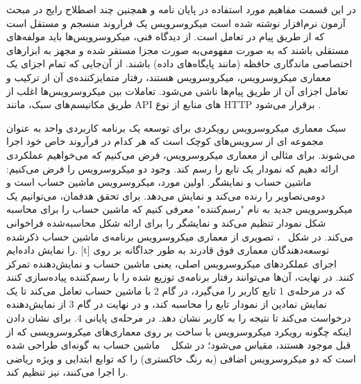 

در این قسمت مفاهیم مورد استفاده در پایان نامه و همچنین چند اصطلاح رایج در مبحث آزمون نرم‌افزار نوشته شده است
میکروسرویس یک فراروند منسجم و مستقل است که از طریق پیام‌ در تعامل است. از دیدگاه فنی، میکروسرویس‌ها باید مولفه‌های مستقلی باشند که به صورت مفهومی‌به صورت مجزا مستقر شده و مجهز به ابزارهای اختصاصی ماندگاری حافظه (مانند پایگاه‌های داده) باشند. از آن‌جایی که تمام اجزای یک معماری میکروسرویس، میکروسرویس هستند، رفتار متمایزکننده‌ی آن از ترکیب و تعامل اجزای آن از طریق پیام‌ها ناشی می‌شود. تعاملات بین میکروسرویس‌ها اغلب از طریق مکانیسم‌های سبک، مانند API های منابع از نوع HTTP برقرار می‌شود . 


سبک معماری میکروسرویس رویکردی برای توسعه یک برنامه کاربردی واحد به عنوان مجموعه ای از سرویس‌های کوچک است که هر کدام در فرآروند خاص خود اجرا می‌شوند. برای مثالی از معماری میکروسرویس، فرض می‌کنیم که می‌خواهیم عملکردی ارائه دهیم که نمودار یک تابع را رسم کند. وجود دو میکروسرویس را فرض می‌کنیم: ماشین حساب و نمایشگر. اولین مورد، میکروسرویس ماشین حساب است و دومی‌تصاویر را رنده می‌کند و نمایش می‌دهد. برای تحقق هدفمان، می‌توانیم یک میکروسرویس جدید به نام "رسم‌کننده" معرفی کنیم که ماشین حساب را برای محاسبه شکل نمودار تنظیم می‌کند و نمایشگر را برای ارائه شکل محاسبه‌شده فراخوانی می‌کند. در شکل ~، تصویری از معماری میکروسرویس برنامه‌ی ماشین حساب ذکر‌شده را نمایش داده‌ایم.
[t]
\vspace{0.5em}
توسعه‌دهندگان معماری فوق قادرند به طور جداگانه بر روی اجرای عملکردهای میکروسرویس اصلی، یعنی ماشین حساب و نمایش‌دهنده تمرکز کنند. 
در نهایت، آن‌ها می‌توانند رفتار برنامه‌ی توزیع شده را با رسم‌کننده پیاده‌سازی کنند که در مرحله‌ی 1 تابع کاربر را می‌گیرد، در گام 2 با ماشین حساب تعامل می‌کند تا یک نمایش نمادین از نمودار تابع را محاسبه کند، و در نهایت در گام 3 از نمایش‌دهنده درخواست می‌کند تا نتیجه را به کاربر نشان دهد. 
در مرحله‌‌ی پایانی 4. برای نشان دادن اینکه چگونه رویکرد میکروسرویس با ساخت بر روی معماری‌های میکروسرویسی که از قبل موجود هستند، مقیاس می‌شود؛ 
در شکل ~ ماشین حساب به ‌گونه‌ای طراحی شده‌ است که دو میکروسرویس اضافی (به رنگ خاکستری) را که توابع ابتدایی و ویژه ریاضی را اجرا می‌کنند، نیز تنظیم کند. 

